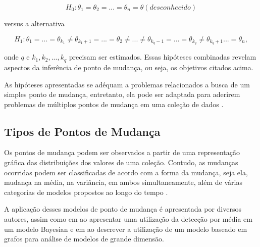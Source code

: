 \begin{equation}
    H_0 : \theta_{1} = \theta_{2} = ... = \theta_{n} = \theta (desconhecido)
    \label{eq:cpd-hupotese-nula-2}
\end{equation}

versus a alternativa

\begin{equation}
    H_1 : \theta_{1} = ... = \theta_{k_1} \not = \theta_{{k_1}+1} = ... = \theta_{2} \not = ... \not = \theta_{{k_q}-1} = ... = \theta_{k_q} \not = \theta_{{k_q}+1}... = \theta_{n},
    \label{eq:cpd-hipotese-alternativa-2}
\end{equation}

onde $q$ e $k_1, k_2, ..., k_q$ precisam ser estimados. Essas hipóteses combinadas revelam aspectos da inferência de ponto de mudança, ou seja, os objetivos citados acima.

As hipóteses apresentadas se adéquam a problemas relacionados a busca de um simples ponto de mudança, entretanto, ela pode ser adaptada para aderirem problemas de múltiplos pontos de mudança em uma coleção de dados \cite{Chen1-2000}.

\subsection{Tipos de Pontos de Mudança}

Os pontos de mudança podem ser observados a partir de uma representação gráfica das distribuições dos valores de uma coleção. Contudo, as mudanças ocorridas podem ser classificadas de acordo com a forma da mudança, seja ela, mudança na média, na variância, em ambos simultaneamente, além de várias categorias de modelos propostos ao longo do tempo \cite{Chen2-2000}.

A aplicação desses modelos de ponto de mudança é apresentada por diversos autores, assim como em \cite{Cheon2010} ao apresentar uma utilização da detecção por média em um modelo Bayesian e em \cite{Shi2017} ao descrever a utilização de um modelo baseado em grafos para análise de modelos de grande dimensão.





